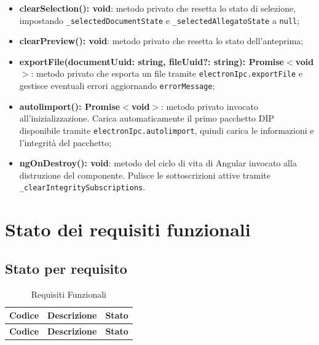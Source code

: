 \documentclass[a4paper,12pt]{article}
\begin{document}
{{{{\begin{itemize}
                    \item \textbf{clearSelection(): void}: metodo privato che resetta lo stato di selezione, impostando \texttt{\_selectedDocumentState} e \texttt{\_selectedAllegatoState} a \texttt{null};
                    \item \textbf{clearPreview(): void}: metodo privato che resetta lo stato dell'anteprima;
                    \item \textbf{exportFile(documentUuid: string, fileUuid?: string): Promise$<$void$>$}: metodo privato che esporta un file tramite \texttt{electronIpc.exportFile} e gestisce eventuali errori aggiornando \texttt{errorMessage};
                    \item \textbf{autolimport(): Promise$<$void$>$}: metodo privato invocato all'inizializzazione. Carica automaticamente il primo pacchetto DIP disponibile tramite \texttt{electronIpc.autolimport}, quindi carica le informazioni e l'integrità del pacchetto;
                    \item \textbf{ngOnDestroy(): void}: metodo del ciclo di vita di Angular invocato alla distruzione del componente. Pulisce le sottoscrizioni attive tramite \texttt{\_clearIntegritySubscriptions}.
                \end{itemize}
            }
        }
    }

    \section{Stato dei requisiti funzionali} {
        \subsection{Stato per requisito} {
            \begin{longtable}{|>{\centering\arraybackslash}m{}|>{\centering\arraybackslash}m{}|>{\centering\arraybackslash}m{}|}
                \caption{Requisiti Funzionali} \\
                
                \hline
                \rowcolor{lightgray}
                \textbf{Codice} & \textbf{Descrizione} & \textbf{Stato} \\
                \hline
                \endfirsthead
                
                \hline
                \rowcolor{lightgray}
                \textbf{Codice} & \textbf{Descrizione} & \textbf{Stato} \\
                \hline
                \endhead
                

\end{longtable}}}}
\end{document}

